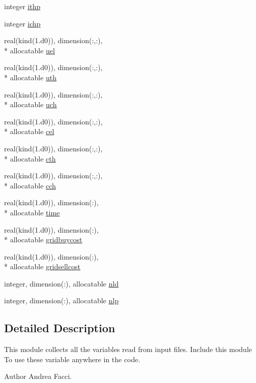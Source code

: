 \begin{DoxyCompactItemize}
integer \hyperlink{classinputvar_abb9734f3e3ee40c97881bd03881065c5}{ithp}
\item 
integer \hyperlink{classinputvar_af57151a30c510558682b98e1b72d844b}{ichp}
\item 
real(kind(1.d0)), dimension(\-:,\-:), \\*
allocatable \hyperlink{classinputvar_a9833eea2b0f2ee5ab1a1927826656d05}{uel}
\item 
real(kind(1.d0)), dimension(\-:,\-:), \\*
allocatable \hyperlink{classinputvar_ace89e7bc6ca01804a1f664e9faec7d0c}{uth}
\item 
real(kind(1.d0)), dimension(\-:,\-:), \\*
allocatable \hyperlink{classinputvar_a889ca8b7a94ff88ec05a082dd2470ac3}{uch}
\item 
real(kind(1.d0)), dimension(\-:,\-:), \\*
allocatable \hyperlink{classinputvar_a82b36ae2c53d6e6f9653b138e3e7452d}{cel}
\item 
real(kind(1.d0)), dimension(\-:,\-:), \\*
allocatable \hyperlink{classinputvar_aca5ff14156cf1451425195acac825d1d}{cth}
\item 
real(kind(1.d0)), dimension(\-:,\-:), \\*
allocatable \hyperlink{classinputvar_a0f5658ba736453b1bc8c607069f9bea1}{cch}
\item 
real(kind(1.d0)), dimension(\-:), \\*
allocatable \hyperlink{classinputvar_a1dcdb33405d780699da5958c347fad91}{time}
\item 
real(kind(1.d0)), dimension(\-:), \\*
allocatable \hyperlink{classinputvar_a7c31f58cc66e43cd8e7caddeda7ad097}{gridbuycost}
\item 
real(kind(1.d0)), dimension(\-:), \\*
allocatable \hyperlink{classinputvar_a4c5f410c351c402a40ef3236195008e7}{gridsellcost}
\item 
integer, dimension(\-:), allocatable \hyperlink{classinputvar_a8c5a23a5a519fb86c67fc1465aef0e33}{nld}
\item 
integer, dimension(\-:), allocatable \hyperlink{classinputvar_a3f2f71983b35bd63596385392671f89d}{nlp}
\end{DoxyCompactItemize}


\subsection{Detailed Description}
This module collects all the variables read from input files. Include this module To use these variable anywhere in the code. \begin{DoxyAuthor}{Author}
Andrea Facci. 
\end{DoxyAuthor}


